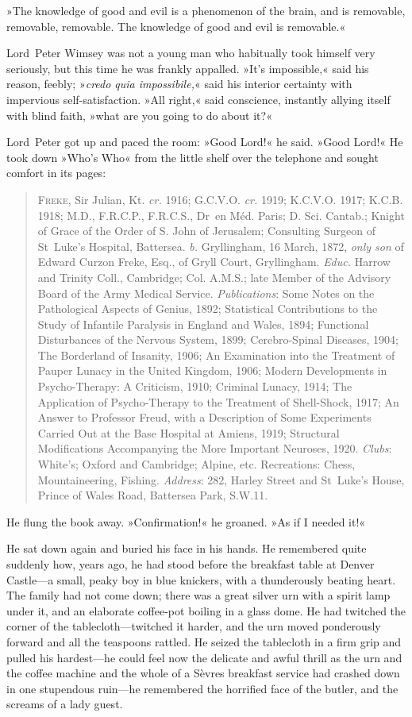 »The knowledge of good and evil is a phenomenon of the brain, and is removable, removable, removable. The knowledge of good and evil is removable.«

Lord~Peter Wimsey was not a young man who habitually took himself very seriously, but this time he was frankly appalled. »It's impossible,« said his reason, feebly; »\textit{credo quia impossibile,}« said his interior certainty with impervious self-satisfaction. »All right,« said conscience, instantly allying itself with blind faith, »what are you going to do about it?«

Lord~Peter got up and paced the room: »Good Lord!« he said. »Good Lord!« He took down »Who's Who« from the little shelf over the telephone and sought comfort in its pages:

\begin{quote}
\textsc{Freke}, Sir Julian, Kt. \textit{cr.} 1916; G.C.V.O. \textit{cr.} 1919; K.C.V.O. 1917; K.C.B. 1918; M.D., F.R.C.P., F.R.C.S., Dr~en Méd. Paris; D. Sci. Cantab.; Knight of Grace of the Order of S. John of Jerusalem; Consulting Surgeon of St~Luke's Hospital, Battersea. \textit{b.} Gryllingham, 16 March, 1872, \textit{only son} of Edward Curzon Freke, Esq., of Gryll Court, Gryllingham. \textit{Educ.} Harrow and Trinity Coll., Cambridge; Col. A.M.S.; late Member of the Advisory Board of the Army Medical Service. \textit{Publications}: Some Notes on the Pathological Aspects of Genius, 1892; Statistical Contributions to the Study of Infantile Paralysis in England and Wales, 1894; Functional Disturbances of the Nervous System, 1899; Cerebro-Spinal Diseases, 1904; The Borderland of Insanity, 1906; An Examination into the Treatment of Pauper Lunacy in the United Kingdom, 1906; Modern Developments in Psycho-Therapy: A Criticism, 1910; Criminal Lunacy, 1914; The Application of Psycho-Therapy to the Treatment of Shell-Shock, 1917; An Answer to Professor Freud, with a Description of Some Experiments Carried Out at the Base Hospital at Amiens, 1919; Structural Modifications Accompanying the More Important Neuroses, 1920. \textit{Clubs}: White's; Oxford and Cambridge; Alpine, etc. Recreations: Chess, Mountaineering, Fishing. \textit{Address}: 282, Harley Street and St~Luke's House, Prince of Wales Road, Battersea Park, S.W.11.
\end{quote}

He flung the book away. »Confirmation!« he groaned. »As if I needed it!«

He sat down again and buried his face in his hands. He remembered quite suddenly how, years ago, he had stood before the breakfast table at Denver Castle—a small, peaky boy in blue knickers, with a thunderously beating heart. The family had not come down; there was a great silver urn with a spirit lamp under it, and an elaborate coffee-pot boiling in a glass dome. He had twitched the corner of the tablecloth—twitched it harder, and the urn moved ponderously forward and all the teaspoons rattled. He seized the tablecloth in a firm grip and pulled his hardest—he could feel now the delicate and awful thrill as the urn and the coffee machine and the whole of a Sèvres breakfast service had crashed down in one stupendous ruin—he remembered the horrified face of the butler, and the screams of a lady guest.

